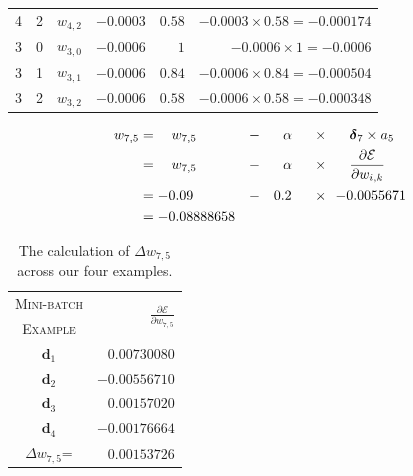 \documentclass[xcolor={table}]{beamer}
\newcommand{\featN}[1]{\textsc{#1}}
\begin{document}
\begin{frame}[plain]
\begin{table}[!tb]
{\begin{tabular}{cccrrr}
4 & 2 & $w_{4,2}$ & ${-0.0003}$ & $0.58$ & ${-0.0003} \times 0.58 = {-0.000174}$\\
3 & 0 & $w_{3,0}$ & ${-0.0006}$ & $1$ & ${-0.0006} \times 1 = {-0.0006}$\\
3 & 1 & $w_{3,1}$ & ${-0.0006}$ & $0.84$ & ${-0.0006} \times 0.84 = {-0.000504}$\\
3 & 2 & $w_{3,2}$ & ${-0.0006}$ & $0.58$ & ${-0.0006} \times 0.58 = {-0.000348}$\\
\hline
\end{tabular}
}
\end{table}
\end{frame} 



 \begin{frame} 
\begin{alignat}{4}
w_{7,5} &= ~~~w_{7,5}  &-~~~&  ~~\alpha &~~\times~~&  ~~~\boldsymbol{\delta}_7 \times  a_5 \notag\\
               ~ &= ~~~w_{7,5}  &-~~~&  ~~\alpha &~~\times~~&  ~~~\frac{\partial \mathcal{E}}{\partial w_{i,k}} \notag\\
               ~ &= -0.09~~~    &-~~~&  0.2 &~~\times~~&  {-0.0055671} \notag\\
               ~ &= {-0.08888658} &&&&                   
\label{eqn:stochasticweightupdateexmple}
\end{alignat}
\end{frame} 



 \begin{frame} 
\begin{table}
\caption {The calculation of $\Delta w_{7,5}$ across our four examples.}
\label{tab:minibatchdelta}
\begin{tabular}{cr}
\hline
\featN{Mini-batch} & \multirow{2}{*}{$\displaystyle \frac{\partial \mathcal{E}}{\partial w_{7,5}}$}\\
\featN{Example} & \\
\hline
$\mathbf{d}_1$ & $0.00730080$\\
$\mathbf{d}_2$ & ${-0.00556710}$\\
$\mathbf{d}_3$ & $0.00157020$\\
$\mathbf{d}_4$ & ${-0.00176664}$\\
\hline
$\displaystyle \Delta w_{7,5}$= & $0.00153726$\\
\hline
\end{tabular}
\end{table}
\end{frame} 
\end{document}
